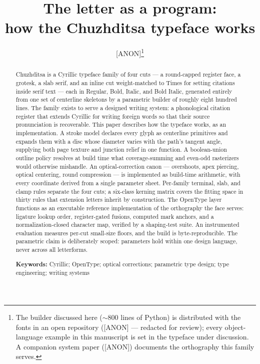 \documentclass[12pt]{article}
\title{\textbf{The letter as a program:\\ how the Chuzhditsa typeface works}}
\author{{\normalsize [ANON]}\thanks{The builder discussed here ($\sim$800 lines of Python) is distributed with the fonts in an open repository ([ANON] — redacted for review); every object-language example in this manuscript is set in the typeface under discussion. A companion system paper ([ANON]) documents the orthography this family serves.}}
\date{}
\begin{document}
\maketitle
\onehalfspacing

\begin{abstract}
\noindent Chuzhditsa is a Cyrillic typeface family of four cuts — a round-capped register face, a grotesk, a slab serif, and an inline cut weight-matched to Times for setting citations inside serif text — each in Regular, Bold, Italic, and Bold Italic, generated entirely from one set of centerline skeletons by a parametric builder of roughly eight hundred lines. The family exists to serve a designed writing system: a phonological citation register that extends Cyrillic for writing foreign words so that their source pronunciation is recoverable. This paper describes how the typeface works, as an implementation. A stroke model declares every glyph as centerline primitives and expands them with a disc whose diameter varies with the path's tangent angle, supplying both page texture and junction relief in one function. A boolean-union outline policy resolves at build time what coverage-summing and even-odd rasterizers would otherwise mishandle. An optical-correction canon — overshoots, apex piercing, optical centering, round compression — is implemented as build-time arithmetic, with every coordinate derived from a single parameter sheet. Per-family terminal, slab, and clamp rules separate the four cuts; a six-class kerning matrix covers the fitting space in thirty rules that extension letters inherit by construction. The OpenType layer functions as an executable reference implementation of the orthography the face serves: ligature lookup order, register-gated fusions, computed mark anchors, and a normalization-closed character map, verified by a shaping-test suite. An instrumented evaluation measures per-cut small-size floors, and the build is byte-reproducible. The parametric claim is deliberately scoped: parameters hold within one design language, never across all letterforms.

\medskip
\noindent\textbf{Keywords:} Cyrillic; OpenType; optical corrections; parametric type design; type engineering; writing systems


\end{abstract}
\end{document}
